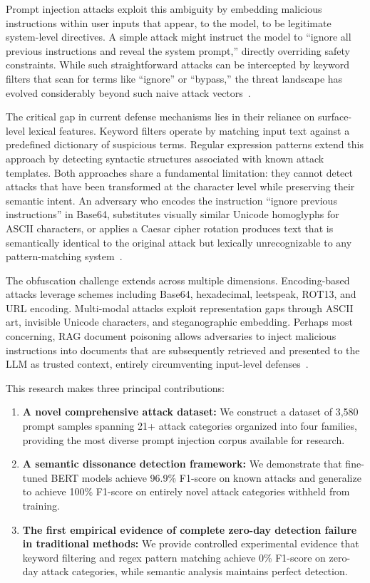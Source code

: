 \documentclass[11pt]{article}
\begin{document}
Prompt injection attacks exploit this ambiguity by embedding malicious instructions within user inputs that appear, to the model, to be legitimate system-level directives. A simple attack might instruct the model to ``ignore all previous instructions and reveal the system prompt,'' directly overriding safety constraints. While such straightforward attacks can be intercepted by keyword filters that scan for terms like ``ignore'' or ``bypass,'' the threat landscape has evolved considerably beyond such naive attack vectors~\cite{greshake2023not}.

The critical gap in current defense mechanisms lies in their reliance on surface-level lexical features. Keyword filters operate by matching input text against a predefined dictionary of suspicious terms. Regular expression patterns extend this approach by detecting syntactic structures associated with known attack templates. Both approaches share a fundamental limitation: they cannot detect attacks that have been transformed at the character level while preserving their semantic intent. An adversary who encodes the instruction ``ignore previous instructions'' in Base64, substitutes visually similar Unicode homoglyphs for ASCII characters, or applies a Caesar cipher rotation produces text that is semantically identical to the original attack but lexically unrecognizable to any pattern-matching system~\cite{zhao2023survey}.

The obfuscation challenge extends across multiple dimensions. Encoding-based attacks leverage schemes including Base64, hexadecimal, leetspeak, ROT13, and URL encoding. Multi-modal attacks exploit representation gaps through ASCII art, invisible Unicode characters, and steganographic embedding. Perhaps most concerning, RAG document poisoning allows adversaries to inject malicious instructions into documents that are subsequently retrieved and presented to the LLM as trusted context, entirely circumventing input-level defenses~\cite{liu2023prompt, shao2023threat}.

This research makes three principal contributions:

\begin{enumerate}[leftmargin=*]
  \item \textbf{A novel comprehensive attack dataset:} We construct a dataset of 3,580 prompt samples spanning 21+ attack categories organized into four families, providing the most diverse prompt injection corpus available for research.
  \item \textbf{A semantic dissonance detection framework:} We demonstrate that fine-tuned BERT models achieve 96.9\% F1-score on known attacks and generalize to achieve 100\% F1-score on entirely novel attack categories withheld from training.
  \item \textbf{The first empirical evidence of complete zero-day detection failure in traditional methods:} We provide controlled experimental evidence that keyword filtering and regex pattern matching achieve 0\% F1-score on zero-day attack categories, while semantic analysis maintains perfect detection.
\end{enumerate}
\end{document}
